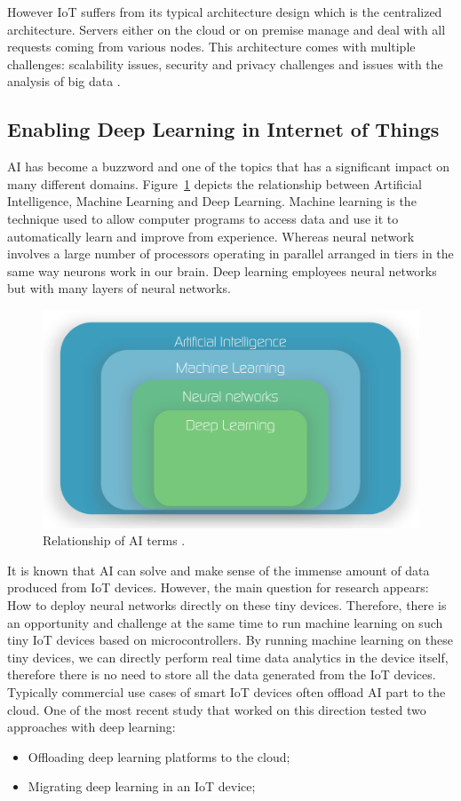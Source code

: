 However IoT suffers from its typical architecture design which is the centralized architecture. Servers either on the cloud or on premise manage and deal with all requests coming from various nodes. This architecture comes with multiple challenges: scalability issues, security and privacy challenges and issues with the analysis of big data \cite{8627114}. 

\subsection{Enabling Deep Learning in Internet of Things}
AI has become a buzzword and one of the topics that has a significant impact on many different domains. Figure~\ref{fig:ai_terms} depicts the relationship between Artificial Intelligence, Machine Learning and Deep Learning. Machine learning is the technique used to allow computer programs to access data and use it to automatically learn and improve from experience. Whereas neural network involves a large number of processors operating in parallel arranged in tiers in the same way neurons work in our brain. Deep learning employees neural networks but with many layers of neural networks. 


\begin{figure}[!htb]
    \centering
    \includegraphics[width=1\textwidth]{figures/ai_classification.png}
    \caption{Relationship of AI terms \cite{AiMachine}.}
    \label{fig:ai_terms}
\end{figure}
It is known that AI can solve and make sense of the immense amount of data produced from IoT devices. However, the main question for research appears: How to deploy neural networks directly on these tiny devices. Therefore, there is an opportunity and challenge at the same time to run machine learning on such tiny IoT devices based on microcontrollers. By running machine learning on these tiny devices, we can directly perform real time data analytics in the device itself, therefore there is no need to store all the data generated from the IoT devices. Typically commercial use cases of smart IoT devices often offload AI part to the cloud. 
One of the most recent study \cite{8057306} that worked on this direction tested two approaches with deep learning: 
\begin{itemize}
    \item Offloading deep learning platforms to the cloud;
    \item Migrating deep learning in an IoT device;
\end{itemize}

